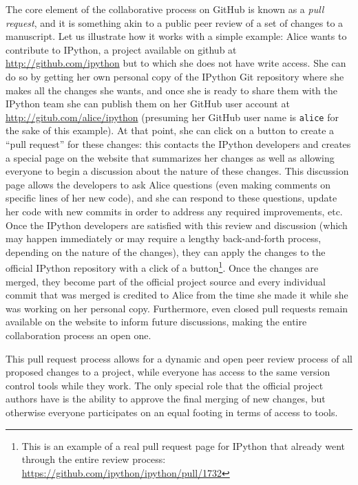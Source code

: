 \documentclass[ChapterTOCs,krantz2]{krantz} %
\theoremstyle{definition}
\begin{document}
The core element of the collaborative process on GitHub is known as a
\emph{pull request}, and it is something akin to a public peer review of a set
of changes to a manuscript.  Let us illustrate how it works with a simple
example: Alice wants to contribute to IPython, a project available on github at
\url{http://github.com/ipython} but to which she does not have write access.
She can do so by getting her own personal copy of the IPython Git repository
where she makes all the changes she wants, and once she is ready to share them
with the IPython team she can publish them on her GitHub user account at
\url{http://gitub.com/alice/ipython} (presuming her GitHub user name is
\texttt{alice} for the sake of this example).  At that point, she can click on
a button to create a ``pull request'' for these changes: this contacts the
IPython developers and creates a special page on the website that summarizes
her changes as well as allowing everyone to begin a discussion about the nature
of these changes.  This discussion page allows the developers to ask Alice
questions (even making comments on specific lines of her new code), and she can
respond to these questions, update her code with new commits in order to
address any required improvements, etc.  Once the IPython developers are
satisfied with this review and discussion (which may happen immediately or may
require a lengthy back-and-forth process, depending on the nature of the
changes), they can apply the changes to the official IPython repository with a
click of a button\footnote{This is an example of a real pull request page for
  IPython that already went through the entire review process:
  \url{https://github.com/ipython/ipython/pull/1732}}.  Once the changes are
merged, they become part of the official project source and every individual
commit that was merged is credited to Alice from the time she made it while she
was working on her personal copy.  Furthermore, even closed pull requests
remain available on the website to inform future discussions, making the entire
collaboration process an open one.

This pull request process allows for a dynamic and open peer review process of
all proposed changes to a project, while everyone has access to the same
version control tools while they work.  The only special role that the official
project authors have is the ability to approve the final merging of new
changes, but otherwise everyone participates on an equal footing in terms of
access to tools.  
\end{document}
